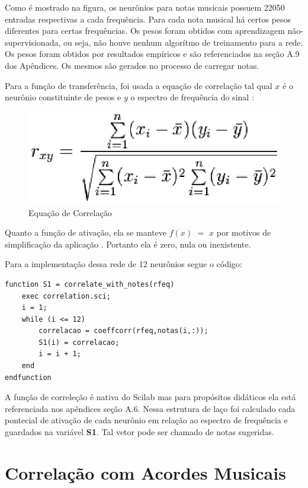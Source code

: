 Como é mostrado na figura, os neurônios para notas musicais possuem 22050 entradas respectivas a cada frequência. Para cada nota musical há certos pesos diferentes para certas frequências. Os pesos foram obtidos com aprendizagem não-supervisionada, ou seja, não houve nenhum algorítmo de treinamento para a rede. Os pesos foram obtidos por resultados empíricos e são referenciados na seção A.9 dos Apêndices. Os mesmos são gerados no processo de carregar notas.

Para a função de transferência, foi usada a equação de correlação tal qual $x$ é o neurônio constituinte de pesos e $y$ o espectro de frequência do sinal \cite{correlacao}:

\begin{figure}[h]
	\centering
		\includegraphics[keepaspectratio=true,scale=0.7]{figuras/correlation-formula}
	\caption{Equação de Correlação}
\end{figure}

Quanto a função de ativação, ela se manteve $f(x)$ $=$ $x$ por motivos de simplificação da aplicação
. Portanto ela é zero, nula ou inexistente.

Para a implementação dessa rede de 12 neurônios segue o código:
\begin{lstlisting}
function S1 = correlate_with_notes(rfeq)
	exec correlation.sci;
	i = 1;
	while (i <= 12)
	    correlacao = coeffcorr(rfeq,notas(i,:));
	    S1(i) = correlacao;
	    i = i + 1;
	end
endfunction
\end{lstlisting}

A função de correleção é nativa do Scilab mas para propósitos didáticos ela está referenciada nos apêndices seção A.6. Nessa estrutura de laço foi calculado cada pontecial de ativação de cada neurônio em relação ao espectro de frequência e guardados na variável \textbf{S1}. Tal vetor pode ser chamado de notas sugeridas.

\section{Correlação com Acordes Musicais}
\label{sec:correlacaoacordes}

